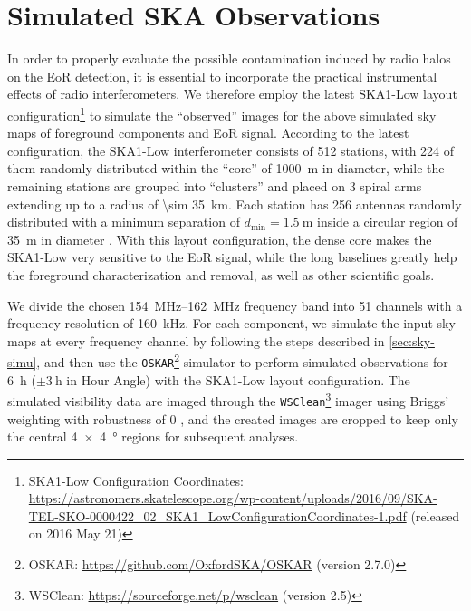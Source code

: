 \documentclass[modern]{aastex62}
\newcommand{\R}[1]{\mathrm{#1}}
\begin{document}
\section{Simulated SKA Observations}
\label{sec:obs-simu}

In order to properly evaluate the possible contamination induced by radio
halos on the EoR detection, it is essential to incorporate the practical
instrumental effects of radio interferometers.
We therefore employ the latest SKA1-Low layout configuration\footnote{%
  SKA1-Low Configuration Coordinates:
  \url{https://astronomers.skatelescope.org/wp-content/uploads/2016/09/SKA-TEL-SKO-0000422_02_SKA1_LowConfigurationCoordinates-1.pdf}
  (released on 2016 May 21)
}
to simulate the \enquote{observed} images for the above simulated sky
maps of foreground components and EoR signal.
According to the latest configuration,
the SKA1-Low interferometer consists of 512 stations, with 224 of them
randomly distributed within the \enquote{core} of \SI{1000}{\meter} in
diameter, while the remaining stations are grouped into \enquote{clusters}
and placed on 3 spiral arms extending up to a radius of
\SI{\sim 35}{\kilo\meter}.
Each station has 256 antennas randomly distributed with a minimum separation
of $d_{\R{min}} = \SI{1.5}{\meter}$ inside a circular region of
\SI{35}{\meter} in diameter \citep[e.g.,][]{mort2017}.
With this layout configuration, the dense core makes the SKA1-Low very
sensitive to the EoR signal, while the long baselines greatly help the
foreground characterization and removal, as well as other scientific goals.

We divide the chosen \SIrange{154}{162}{\MHz} frequency band into 51
channels with a frequency resolution of \SI{160}{\kilo\hertz}.
For each component, we simulate the input sky maps at every frequency
channel by following the steps described in \autoref{sec:sky-simu},
and then use the \texttt{OSKAR}\footnote{%
  OSKAR: \url{https://github.com/OxfordSKA/OSKAR} (version 2.7.0)}
simulator \citep{mort2010} to perform simulated observations
for \SI{6}{\hour} ($\pm \SI{3}{\hour}$ in Hour Angle) with the
SKA1-Low layout configuration.
The simulated visibility data are imaged through the
\texttt{WSClean}\footnote{%
  WSClean: \url{https://sourceforge.net/p/wsclean} (version 2.5)}
imager \citep{offringa2014} using Briggs' weighting with
robustness of 0 \citep{briggs1995},
and the created images are cropped to keep only the central
\SI[product-units=repeat]{4 x 4}{\degree} regions for subsequent analyses.
\end{document}
